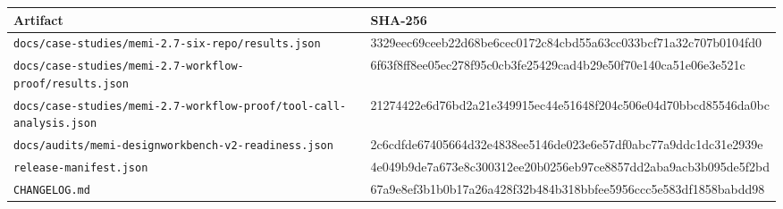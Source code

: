 \begin{tabularx}{\textwidth}{@{}X>{\ttfamily\tiny\raggedright\arraybackslash}p{}@{}}
\toprule
Artifact & SHA-256 \\
\midrule
\nolinkurl{docs/case-studies/memi-2.7-six-repo/results.json} & 3329eec69ceeb22d68be6cec0172c84cbd55a63cc033bcf71a32c707b0104fd0 \\
\nolinkurl{docs/case-studies/memi-2.7-workflow-proof/results.json} & 6f63f8ff8ee05ec278f95c0cb3fe25429cad4b29e50f70e140ca51e06e3e521c \\
\nolinkurl{docs/case-studies/memi-2.7-workflow-proof/tool-call-analysis.json} & 21274422e6d76bd2a21e349915ec44e51648f204c506e04d70bbcd85546da0bc \\
\nolinkurl{docs/audits/memi-designworkbench-v2-readiness.json} & 2c6cdfde67405664d32e4838ee5146de023e6e57df0abc77a9ddc1dc31e2939e \\
\nolinkurl{release-manifest.json} & 4e049b9de7a673e8c300312ee20b0256eb97ce8857dd2aba9acb3b095de5f2bd \\
\nolinkurl{CHANGELOG.md} & 67a9e8ef3b1b0b17a26a428f32b484b318bbfee5956ccc5e583df1858babdd98 \\
\bottomrule
\end{tabularx}

